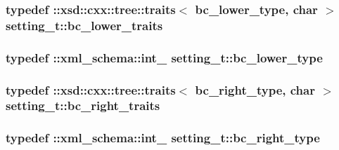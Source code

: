 \subsubsection[{\texorpdfstring{bc\+\_\+lower\+\_\+traits}{bc_lower_traits}}]{\setlength{\rightskip}{0pt plus 5cm}typedef \+::xsd\+::cxx\+::tree\+::traits$<$ {\bf bc\+\_\+lower\+\_\+type}, char $>$ {\bf setting\+\_\+t\+::bc\+\_\+lower\+\_\+traits}}\hypertarget{classsetting__t_a59114f8a8f73c5064628778c0e1cb9d5}{}\label{classsetting__t_a59114f8a8f73c5064628778c0e1cb9d5}
\subsubsection[{\texorpdfstring{bc\+\_\+lower\+\_\+type}{bc_lower_type}}]{\setlength{\rightskip}{0pt plus 5cm}typedef \+::{\bf xml\+\_\+schema\+::int\+\_\+} {\bf setting\+\_\+t\+::bc\+\_\+lower\+\_\+type}}\hypertarget{classsetting__t_a69864ad49075236ce00f2a73cdcbb13b}{}\label{classsetting__t_a69864ad49075236ce00f2a73cdcbb13b}
\subsubsection[{\texorpdfstring{bc\+\_\+right\+\_\+traits}{bc_right_traits}}]{\setlength{\rightskip}{0pt plus 5cm}typedef \+::xsd\+::cxx\+::tree\+::traits$<$ {\bf bc\+\_\+right\+\_\+type}, char $>$ {\bf setting\+\_\+t\+::bc\+\_\+right\+\_\+traits}}\hypertarget{classsetting__t_abe4962aa498bbe5c5289cc8ba26dbd8e}{}\label{classsetting__t_abe4962aa498bbe5c5289cc8ba26dbd8e}
\subsubsection[{\texorpdfstring{bc\+\_\+right\+\_\+type}{bc_right_type}}]{\setlength{\rightskip}{0pt plus 5cm}typedef \+::{\bf xml\+\_\+schema\+::int\+\_\+} {\bf setting\+\_\+t\+::bc\+\_\+right\+\_\+type}}\hypertarget{classsetting__t_a958fcc958aca728509db3a1f3756a0c9}{}\label{classsetting__t_a958fcc958aca728509db3a1f3756a0c9}
